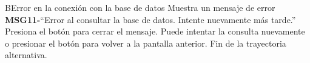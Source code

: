 \begin{UCtrayectoriaA}{B}{Error en la conexión con la base de datos}
	\UCpaso Muestra un mensaje de error {\bf MSG11-}{``Error al consultar la base de datos. Intente nuevamente más tarde.''}
	\UCpaso[\UCactor] Presiona el botón  para cerrar el mensaje.
	\UCpaso[\UCactor] Puede intentar la consulta nuevamente o presionar el botón  para volver a la pantalla anterior.
	\UCpaso Fin de la trayectoria alternativa.
\end{UCtrayectoriaA}

